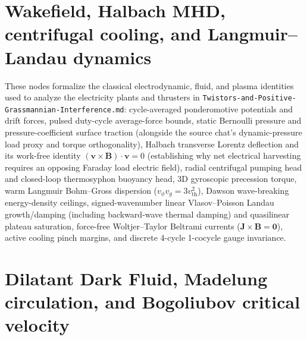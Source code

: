 \section{Wakefield, Halbach MHD, centrifugal cooling, and Langmuir--Landau dynamics}

These nodes formalize the classical electrodynamic, fluid, and plasma identities
used to analyze the electricity plants and thrusters in
\texttt{Twistors-and-Positive-Grassmannian-Interference.md}:
cycle-averaged ponderomotive potentials and drift forces, pulsed duty-cycle
average-force bounds, static Bernoulli pressure and pressure-coefficient surface
traction (alongside the source chat's dynamic-pressure load proxy and torque
orthogonality), Halbach transverse Lorentz deflection and its work-free identity
$(\mathbf v\times\mathbf B)\cdot\mathbf v=0$ (establishing why net electrical
harvesting requires an opposing Faraday load electric field), radial centrifugal
pumping head and closed-loop thermosyphon buoyancy head, 3D gyroscopic
precession torque, warm Langmuir Bohm--Gross dispersion
($v_\phi v_g=3v_{\mathrm{th}}^2$), Dawson wave-breaking energy-density ceilings,
signed-wavenumber linear Vlasov--Poisson Landau growth/damping (including
backward-wave thermal damping) and quasilinear plateau saturation,
force-free Woltjer--Taylor Beltrami currents ($\mathbf J\times\mathbf B=\mathbf 0$),
active cooling pinch margins, and discrete 4-cycle 1-cocycle gauge invariance.


\section{Dilatant Dark Fluid, Madelung circulation, and Bogoliubov critical velocity}

